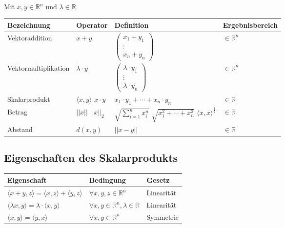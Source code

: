 \documentclass[pdftex,12pt,a4paper,fleqn]{scrartcl}
\begin{document}
Mit $x,y \in \mathbb{R}^n$ und $\lambda \in \mathbb{R}$

\begin{tabular}{|l|p{2.5cm}|p{5cm}|l|}
	\hline
	Bezeichnung & Operator & Definition & Ergebnisbereich\\
	\hline
	Vektoraddition & $x+y $&$
	\begin{pmatrix}
		x_1 + y_1\\
		\vdots\\
		x_n + y_n
	\end{pmatrix}$ & $\in \mathbb{R}^n$\\
	\hline
	Vektormultiplikation &  $ \lambda \cdot y $&$ 
	\begin{pmatrix}
		\lambda \cdot y_1\\
		\vdots\\
		\lambda \cdot y_n
	\end{pmatrix}$ & $\in \mathbb{R}^n$\\
	\hline
	Skalarprodukt & 
	$\langle x,y \rangle $ \newline
	$x \cdot y$
	&$ x_1 \cdot y_1 + \cdots + x_n \cdot y_n$
	& $\in \mathbb{R}$\\
	\hline
	Betrag &
	$ ||x|| $ \newline
	$ ||x||_2 $& 
	$ \sqrt{\sum_{i=1}^n x_i^n} $ \newline
	$ \sqrt{ x_1^2 + \cdots + x_n^2 } $ \newline
	$ \langle x,x \rangle^{ \frac{1}{2} }$
	& $\in \mathbb{R}$\\
	\hline
	Abstand & $d(x,y)$ & $||x-y||$ & $\in \mathbb{R}$\\
	\hline
\end{tabular}


\subsection{Eigenschaften des Skalarprodukts} %
\label{sub:eigenschaften_des_skalarprodukts}

\begin{tabular}{|l|l|l|}
	\hline
	Eigenschaft & Bedingung & Gesetz\\
	\hline
	$\langle x+y,z \rangle = \langle x,z \rangle + \langle y,z \rangle $ &
	$ \forall x,y,z \in \mathbb{R}^n $ & Linearität\\
	\hline
	$\langle \lambda x,y \rangle = \lambda \cdot \langle x,y \rangle$ &
	$ \forall x,y \in \mathbb{R}^n, \lambda \in \mathbb{R} $ & Linearität\\
	\hline
	$\langle x,y \rangle = \langle y,x \rangle$ &
	$ \forall x,y \in \mathbb{R}^n $ & Symmetrie\\
	\hline
\end{tabular}


\end{document}
